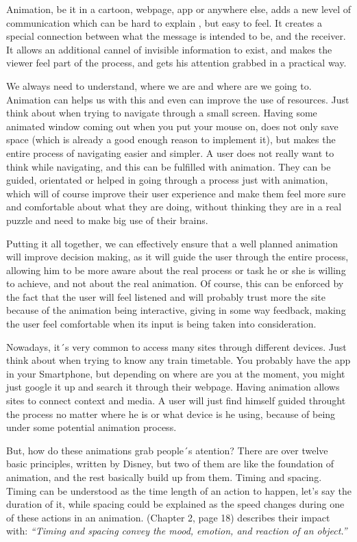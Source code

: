Animation, be it in a cartoon, webpage, app or anywhere else, adds a new level of communication which can be hard to explain , but easy to feel. It creates a special connection between what the message is intended to be, and the receiver. It allows an additional cannel of invisible information to exist, and makes the viewer feel part of the process, and gets his attention grabbed in a practical way.

We always need to understand, where we are and where are we going to. Animation can helps us with this and even can improve the use of resources. Just think about when trying to navigate through a small screen. Having some animated window coming out when you put your mouse on, does not only save space (which is already a good enough reason to implement it), but makes the entire process of navigating easier and simpler. A user does not really want to think while navigating, and this can be fulfilled with animation. They can be guided, orientated or helped in going through a process just with animation, which will of course improve their user experience and make them feel more sure and comfortable about what they are doing, without thinking they are in a real puzzle and need to make big use of their brains.

Putting it all together, we can effectively ensure that a well planned animation will improve decision making, as it will guide the user through the entire process, allowing him to be more aware about the real process or task he or she is willing to achieve, and not about the real animation. Of course, this can be enforced by the fact that the user will feel listened and will probably trust more the site because of the animation being interactive, giving in some way feedback, making the user feel comfortable when its input is being taken into consideration.

Nowadays, it´s very common to access many sites through different devices. Just think about when trying to know any train timetable. You probably have the app in your Smartphone, but depending on where are you at the moment, you might just google it up and search it through their webpage. Having animation allows sites to connect context and media. A user will just find himself guided throught the process no matter where he is or what device is he using, because of being under some potential animation process. 

But, how do these animations grab people´s atention? There are over twelve basic principles, written by Disney, but two of them are like the foundation of animation, and the rest basically build up from them. Timing and spacing. Timing can be understood as the time length of an action to happen, let’s say the duration of it, while spacing could be explained as the speed changes during one of these actions in an animation. 
\citet{head2016designing} (Chapter 2, page 18) describes their impact with: {\em“Timing and spacing convey the mood, emotion, and reaction of an object.”}


